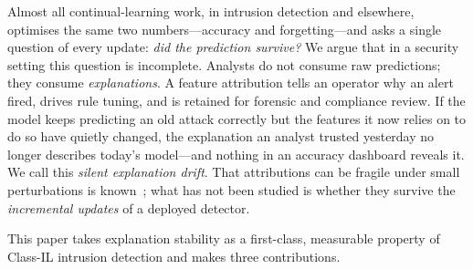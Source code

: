 \documentclass[conference]{IEEEtran}
\begin{document}
Almost all continual-learning work, in intrusion detection and elsewhere,
optimises the same two numbers---accuracy and forgetting---and asks a single
question of every update: \emph{did the prediction survive?} We argue that in a
security setting this question is incomplete. Analysts do not consume raw
predictions; they consume \emph{explanations}. A feature attribution tells an
operator why an alert fired, drives rule tuning, and is retained for forensic
and compliance review. If the model keeps predicting an old attack correctly but
the features it now relies on to do so have quietly changed, the explanation an
analyst trusted yesterday no longer describes today's model---and nothing in an
accuracy dashboard reveals it. We call this \emph{silent explanation drift}.
That attributions can be fragile under small perturbations is
known~\cite{ghorbani2019interpretation}; what has not been studied is whether
they survive the \emph{incremental updates} of a deployed detector.

This paper takes explanation stability as a first-class, measurable property of
Class-IL intrusion detection and makes three contributions.
\end{document}

